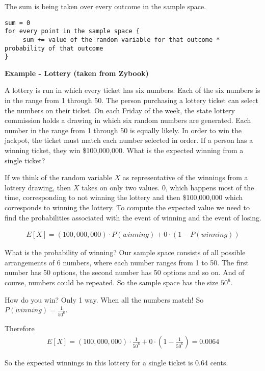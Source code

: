 \documentclass[12pt]{article}
\begin{document}
The sum is being taken over every outcome in the sample space. 

\begin{verbatim}
sum = 0
for every point in the sample space {
     sum += value of the random variable for that outcome * probability of that outcome
}
\end{verbatim}

\textbf{Example - Lottery (taken from Zybook)}

A lottery is run in which every ticket has six numbers. Each of the six numbers is in the range from 1 through 50. The person purchasing a lottery ticket can select the numbers on their ticket. On each Friday of the week, the state lottery commission holds a drawing in which six random numbers are generated. Each number in the range from 1 through 50 is equally likely. In order to win the jackpot, the ticket must match each number selected in order. If a person has a winning ticket, they win \$100,000,000. What is the expected winning from a single ticket?

If we think of the random variable $X$ as representative of the winnings from a lottery drawing, then $X$ takes on only two values. 0, which happens most of the time, corresponding to not winning the lottery and then \$100,000,000 which corresponds to winning the lottery. To compute the expected value we need to find the probabilities associated with the event of winning and the event of losing.

\begin{align*}
E[X] = (100,000,000) \cdot P(winning) + 0 \cdot (1 - P(winning))
\end{align*}

What is the probability of winning? Our sample space consists of all possible arrangements of 6 numbers, where each number ranges from 1 to 50. The first number has 50 options, the second number has 50 options and so on. And of course, numbers could be repeated. So the sample space has the size $50^6$. 

How do you win? Only 1 way. When all the numbers match! So $P(winning) = \frac{1}{50^6}$.

Therefore 
\begin{align*}
E[X] = (100,000,000) \cdot \frac{1}{50^6} + 0 \cdot (1 - \frac{1}{50^6}) = 0.0064
\end{align*}

So the expected winnings in this lottery for a single ticket is 0.64 cents.

\medskip
\end{document}
